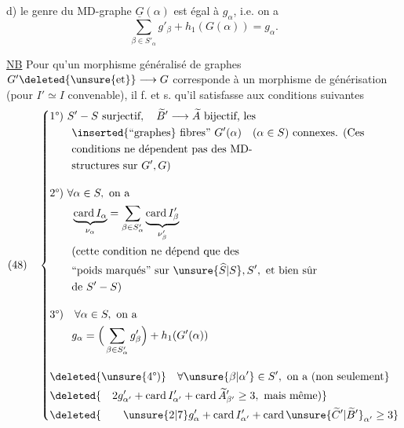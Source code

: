 

d) le genre du MD-graphe $\underline G(\alpha)$ est égal à $g_\alpha$, i.e. on a
\[
\sum_{\beta\in S'_\alpha}g'_\beta+h_1(G(\alpha))=g_\alpha.
\]

\uline{NB} Pour qu'un morphisme généralisé de graphes $G'\deleted{\unsure{\text{et}}}\longrightarrow G$ corresponde à un morphisme de générisation (pour $I'\simeq I$ convenable), il f. et s. qu'il satisfasse aux conditions suivantes
\[
(48)\quad\left\{\begin{aligned}
&\text{1°) }S'-S\text{ surjectif},\quad\widetilde B'\longrightarrow\widetilde A\text{ bijectif, les}\\
&\qquad\inserted{\text{``graphes}}\text{ fibres'' }G'(\alpha)\quad(\alpha\in S)\text{ connexes. (Ces}\\
&\qquad\text{conditions ne dépendent pas des MD-}\\
&\qquad\text{structures sur }G',G\text{)}\\[1em]
&\text{2°) }\forall\alpha\in S,\text{ on a}\\
&\qquad\underbrace{\operatorname{card}I_\alpha}_{\nu_\alpha}=\sum_{\beta\in S'_\alpha}\underbrace{\operatorname{card}I'_\beta}_{\nu'_\beta}\\
&\qquad\text{(cette condition ne dépend que des}\\
&\qquad\text{``poids marqués'' sur }\unsure{\widehat S|S},S',\text{ et bien sûr}\\
&\qquad\text{de }S'-S\text{)}\\[1em]
&\text{3°)}\quad\forall\alpha\in S,\text{ on a}\\
&\qquad g_\alpha=\Big(\sum_{\beta\in S'_\alpha}g'_\beta\Big)+h_1(G'(\alpha))\\[1em]
&\deleted{\unsure{\text{4°)}}\quad\forall\unsure{\beta|\alpha'}\in S',\text{ on a (non seulement}}\\
&\deleted{\quad2g'_{\alpha'}+\operatorname{card}I'_{\alpha'}+\operatorname{card}\widetilde A'_{\beta'}\geq3,\text{ mais même)}}\\
&\deleted{\qquad\unsure{2|7}g'_{\alpha}+\operatorname{card}I'_{\alpha'}+\operatorname{card}\unsure{\widetilde C'|\widetilde B'}_{\alpha'}\geq3}
\end{aligned}\right.
\]

